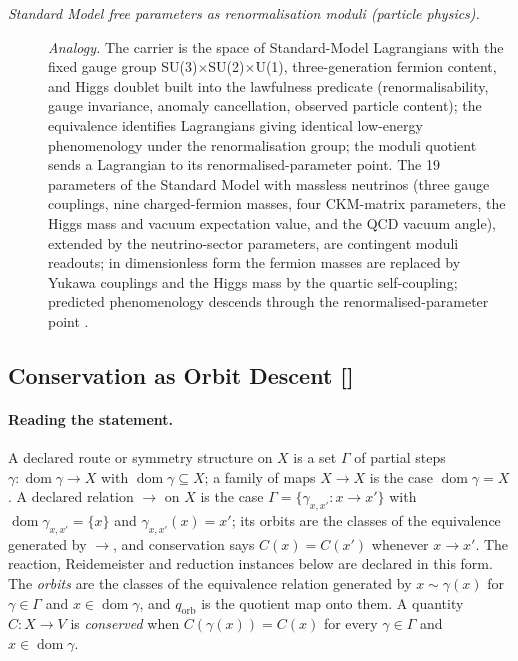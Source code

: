 \begin{description}
\item[\emph{Standard Model free parameters as
renormalisation moduli (particle physics).}] \textit{Analogy.}
The carrier is the space of Standard-Model Lagrangians
with the fixed gauge group
SU(3)\(\times\)SU(2)\(\times\)U(1), three-generation
fermion content, and Higgs doublet built into the
lawfulness predicate (renormalisability, gauge
invariance, anomaly cancellation, observed particle
content); the equivalence identifies Lagrangians giving
identical low-energy phenomenology under the
renormalisation group; the moduli quotient sends a
Lagrangian to its renormalised-parameter point.  The 19
parameters of the Standard Model with massless neutrinos (three
gauge couplings, nine charged-fermion masses, four CKM-matrix
parameters, the Higgs mass and vacuum expectation value, and the QCD
vacuum angle), extended by the neutrino-sector parameters, are
contingent moduli readouts; in dimensionless form the fermion
masses are replaced by Yukawa couplings and the Higgs mass by the
quartic self-coupling; predicted phenomenology descends
through the renormalised-parameter point
\citep{Workman2022Review}.

\end{description}
\endgroup


\subsection{Conservation as Orbit Descent [\texorpdfstring{}{F27}]}\label{sec:status-records-coherence:conservation}

\paragraph{Reading the statement.}
A declared route or symmetry structure on \(X\) is a set \(\Gamma\) of partial
steps \(\gamma:\operatorname{dom}\gamma\to X\) with
\(\operatorname{dom}\gamma\subseteq X\); a family of maps \(X\to X\) is the case
\(\operatorname{dom}\gamma=X\). A declared relation \(\to\) on \(X\) is the case
\(\Gamma=\{\gamma_{x,x'}:x\to x'\}\) with \(\operatorname{dom}\gamma_{x,x'}=\{x\}\) and
\(\gamma_{x,x'}(x)=x'\); its orbits are the classes of the equivalence generated
by \(\to\), and conservation says \(C(x)=C(x')\) whenever \(x\to x'\). The reaction,
Reidemeister and reduction instances below are declared in this form. The \emph{orbits} are the classes of the
equivalence relation generated by \(x\sim\gamma(x)\) for \(\gamma\in\Gamma\)
and \(x\in\operatorname{dom}\gamma\), and \(q_{\mathrm{orb}}\) is the quotient
map onto them. A quantity \(C:X\to V\) is \emph{conserved} when
\(C(\gamma(x))=C(x)\) for every \(\gamma\in\Gamma\) and
\(x\in\operatorname{dom}\gamma\).


